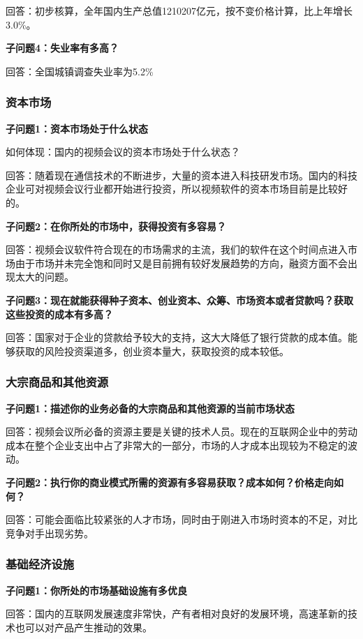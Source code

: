 \documentclass[a4paper,12pt]{article}
\begin{document}
    回答：初步核算，全年国内生产总值1210207亿元，按不变价格计算，比上年增长3.0\%。

    \textbf{子问题4：失业率有多高？}

    回答：全国城镇调查失业率为5.2\%

    \subsubsection{资本市场}
    \textbf{子问题1：资本市场处于什么状态}

    如何体现：国内的视频会议的资本市场处于什么状态？

    回答：随着现在通信技术的不断进步，大量的资本进入科技研发市场。国内的科技企业可对视频会议行业都开始进行投资，所以视频软件的资本市场目前是比较好的。
    
    \textbf{子问题2：在你所处的市场中，获得投资有多容易？}

    回答：视频会议软件符合现在的市场需求的主流，我们的软件在这个时间点进入市场由于市场并未完全饱和同时又是目前拥有较好发展趋势的方向，融资方面不会出现太大的问题。

    \textbf{子问题3：现在就能获得种子资本、创业资本、众筹、市场资本或者贷款吗？获取这些投资的成本有多高？}

    回答：国家对于企业的贷款给予较大的支持，这大大降低了银行贷款的成本值。能够获取的风险投资渠道多，创业资本量大，获取投资的成本较低。

    \subsubsection{大宗商品和其他资源}
    \textbf{子问题1：描述你的业务必备的大宗商品和其他资源的当前市场状态}

    回答：视频会议所必备的资源主要是关键的技术人员。现在的互联网企业中的劳动成本在整个企业支出中占了非常大的一部分，市场的人才成本出现较为不稳定的波动。

    \textbf{子问题2：执行你的商业模式所需的资源有多容易获取？成本如何？价格走向如何？}

    回答：可能会面临比较紧张的人才市场，同时由于刚进入市场时资本的不足，对比竞争对手出现劣势。

    \subsubsection{基础经济设施}
    \textbf{子问题1：你所处的市场基础设施有多优良}

    回答：国内的互联网发展速度非常快，产有者相对良好的发展环境，高速革新的技术也可以对产品产生推动的效果。
\end{document}
